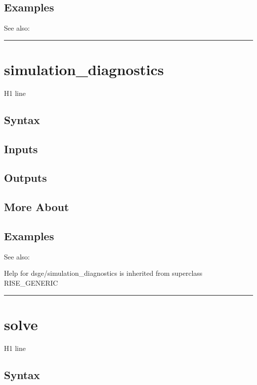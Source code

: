 \documentclass[letterpaper,10pt,english]{sphinxmanual}
\begin{document}
\subsection{Examples}
\label{classes/models/@dsge/dsge:id181}
See also:


\bigskip\hrule{}\bigskip



\section{simulation\_diagnostics}
\label{classes/models/@dsge/dsge:id182}\label{classes/models/@dsge/dsge:simulation-diagnostics}
H1 line


\subsection{Syntax}
\label{classes/models/@dsge/dsge:id183}

\subsection{Inputs}
\label{classes/models/@dsge/dsge:id184}

\subsection{Outputs}
\label{classes/models/@dsge/dsge:id185}

\subsection{More About}
\label{classes/models/@dsge/dsge:id186}

\subsection{Examples}
\label{classes/models/@dsge/dsge:id187}
See also:

Help for dsge/simulation\_diagnostics is inherited from superclass RISE\_GENERIC


\bigskip\hrule{}\bigskip



\section{solve}
\label{classes/models/@dsge/dsge:id188}\label{classes/models/@dsge/dsge:solve}
H1 line


\subsection{Syntax}
\label{classes/models/@dsge/dsge:id189}
\end{document}
